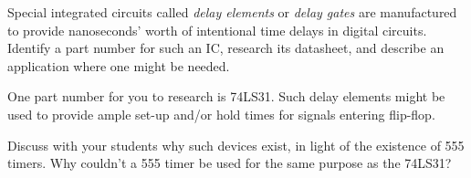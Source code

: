 

Special integrated circuits called {\it delay elements} or {\it delay gates} are manufactured to provide nanoseconds' worth of intentional time delays in digital circuits.  Identify a part number for such an IC, research its datasheet, and describe an application where one might be needed.







One part number for you to research is 74LS31.  Such delay elements might be used to provide ample set-up and/or hold times for signals entering flip-flop.







Discuss with your students why such devices exist, in light of the existence of 555 timers.  Why couldn't a 555 timer be used for the same purpose as the 74LS31?





